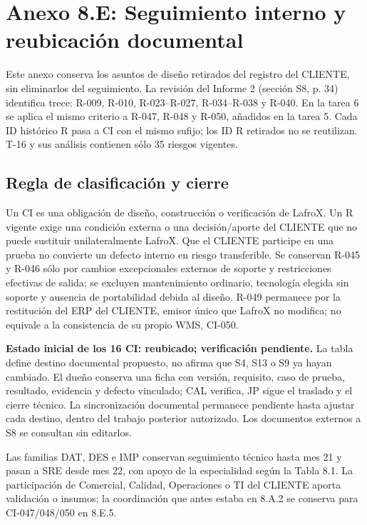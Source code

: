 \clearpage
\section{Anexo 8.E: Seguimiento interno y reubicación documental}

Este anexo conserva los asuntos de diseño retirados del registro del CLIENTE, sin eliminarlos del seguimiento. La revisión del Informe 2 (sección S8, p. 34) identifica trece: R-009, R-010, R-023--R-027, R-034--R-038 y R-040. En la tarea 6 se aplica el mismo criterio a R-047, R-048 y R-050, añadidos en la tarea 5. Cada ID histórico R pasa a CI con el mismo sufijo; los ID R retirados no se reutilizan. T-16 y sus análisis contienen sólo 35 riesgos vigentes.

\subsection*{Regla de clasificación y cierre}

Un CI es una obligación de diseño, construcción o verificación de LafroX. Un R vigente exige una condición externa o una decisión/aporte del CLIENTE que no puede sustituir unilateralmente LafroX. Que el CLIENTE participe en una prueba no convierte un defecto interno en riesgo transferible. Se conservan R-045 y R-046 sólo por cambios excepcionales externos de soporte y restricciones efectivas de salida; se excluyen mantenimiento ordinario, tecnología elegida sin soporte y ausencia de portabilidad debida al diseño. R-049 permanece por la restitución del ERP del CLIENTE, emisor único que LafroX no modifica; no equivale a la consistencia de su propio WMS, CI-050.

\textbf{Estado inicial de los 16 CI: reubicado; verificación pendiente.} La tabla define destino documental propuesto, no afirma que S4, S13 o S9 ya hayan cambiado. El dueño conserva una ficha con versión, requisito, caso de prueba, resultado, evidencia y defecto vinculado; CAL verifica, JP sigue el traslado y el cierre técnico. La sincronización documental permanece pendiente hasta ajustar cada destino, dentro del trabajo posterior autorizado. Los documentos externos a S8 se consultan sin editarlos.

Las familias DAT, DES e IMP conservan seguimiento técnico hasta mes 21 y pasan a SRE desde mes 22, con apoyo de la especialidad según la Tabla 8.1. La participación de Comercial, Calidad, Operaciones o TI del CLIENTE aporta validación o insumos; la coordinación que antes estaba en 8.A.2 se conserva para CI-047/048/050 en 8.E.5.

